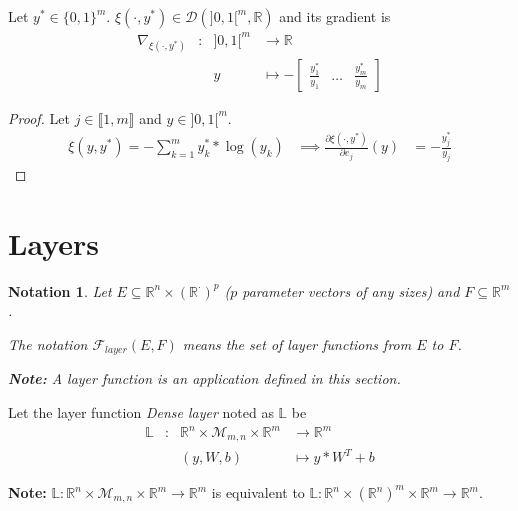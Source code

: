 \documentclass[11pt,en]{elegantpaper}
\newtheorem{notation}{Notation}
\newcommand{\Real}{\mathbb{R}}
\begin{document}
\begin{proposition}
  {\normalfont
    Let $y^* \in \{0,1\}^m$. $\xi(\cdot,y^*) \in \mathcal{D}(]0,1[^m, \Real)$ and its gradient is \begin{equation}\label{prop:cce_differential}
      \begin{array}{llll}
        \nabla_{\xi(\cdot,y^*)} & : & ]0,1[^m  & \longrightarrow \Real \\
        &   & y & \longmapsto - \begin{bmatrix}
          \frac{y^*_1}{y_1} & \ldots & \frac{y^*_m}{y_m}
        \end{bmatrix}
      \end{array}
    \end{equation}
  }
\end{proposition}

\begin{proof}
  Let $j \in \llbracket 1,m \rrbracket$ and $y \in ]0,1[^m$. \begin{equation*}
    \begin{array}{lll}
      \xi(y,y^*) = - \sum_{k=1}^m y_k^* * \log(y_k) & \implies \frac{\partial \xi(\cdot,y^*)}{\partial e_j} (y) & = - \frac{y_j^*}{y_j}
    \end{array}
  \end{equation*}
\end{proof}

\section{Layers}

\begin{notation}
  Let $E \subseteq \Real^n \times (\Real^{\cdot})^p$ ($p$ parameter vectors of any sizes) and $F \subseteq \Real^m$. \par
  The notation $\mathcal{F}_{layer}(E,F)$ means the set of layer functions from $E$ to $F$. \par
  \textbf{Note:} A layer function is an application defined in this section. \par
\end{notation}

\begin{definition}
  Let the layer function \textit{Dense layer} noted as $\mathbb{L}$ be
  \begin{equation*}
    \begin{array}{llll}
      \mathbb{L} & : & \Real^n \times \mathcal{M}_{m,n} \times \Real^m & \longrightarrow \Real^m \\
      &   & (y,W,b) & \longmapsto y * W^T + b
    \end{array}
  \end{equation*} \par
  \textbf{Note:} $\mathbb{L} : \Real^n \times \mathcal{M}_{m,n} \times \Real^m \longrightarrow \Real^m$
  is equivalent to $\mathbb{L} : \Real^n \times (\Real^n)^{m} \times \Real^m \longrightarrow \Real^m$.
\end{definition}
\end{document}
